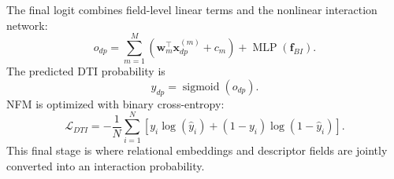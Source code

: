 The final logit combines field-level linear terms and the nonlinear interaction network:
\begin{equation}
    o_{dp}
    =
    \sum_{m=1}^{M}
    \left(
        \mathbf{w}_{m}^{\top}\mathbf{x}_{dp}^{(m)}+c_m
    \right)
    +
    \operatorname{MLP}(\mathbf{f}_{BI}).
\end{equation}
The predicted DTI probability is
\begin{equation}
    \hat{y}_{dp}=\operatorname{sigmoid}(o_{dp}).
\end{equation}
NFM is optimized with binary cross-entropy:
\begin{equation}
    \mathcal{L}_{DTI}
    =
    -\frac{1}{N}
    \sum_{i=1}^{N}
    \left[
        y_i\log(\hat{y}_i)
        +(1-y_i)\log(1-\hat{y}_i)
    \right].
\end{equation}
This final stage is where relational embeddings and descriptor fields are jointly converted into an interaction probability.

